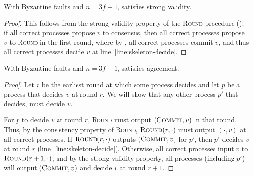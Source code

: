 \begin{theorem}\label{thm:validity-byz}
    With Byzantine faults and $n=3f+1$,  satisfies strong validity.
\end{theorem}
\begin{proof}
    This follows from the strong validity property of the \textsc{Round} procedure (): if all correct processes propose $v$ to consensus, then all correct processes propose $v$ to \textsc{Round} in the first round, where by , all correct processes commit $v$, and thus all correct processes decide $v$ at line~\ref{line:skeleton-decide}.
\end{proof}

\begin{theorem}\label{thm:agreement-byz}
    With Byzantine faults and $n=3f+1$,  satisfies agreement.
\end{theorem}
\begin{proof}
    Let $r$ be the earliest round at which some process decides and let $p$ be a process that decides $v$ at round $r$. We will show that any other process $p'$ that decides, must decide $v$. 
    
    For $p$ to decide $v$ at round $r$, \textsc{Round} must output $(\textsc{Commit}, v)$ in that round. Thus, by the consistency property of \textsc{Round}, $\textsc{Round}(r,\cdot)$ must output $(\cdot, v)$ at all correct processes. If $\textsc{Round}(r,\cdot)$ outputs $(\textsc{Commit}, v)$ for $p'$, then $p'$ decides $v$ at round $r$ (line~\ref{line:skeleton-decide}). Otherwise, all correct processes input $v$ to $\textsc{Round}(r+1,\cdot)$, and by the strong validity property, all processes (including $p'$) will output $(\textsc{Commit}, v)$ and decide $v$ at round $r+1$.
\end{proof}

